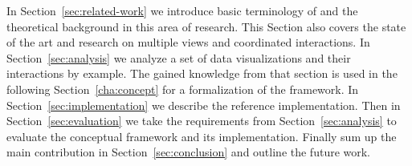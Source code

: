 In Section~\ref{sec:related-work} we introduce basic terminology of \cmvs{} and the theoretical background in this area of research.
This Section also covers the state of the art and research on multiple views and coordinated interactions.
In Section~\ref{sec:analysis} we analyze a set of data visualizations and their interactions by example.
The gained knowledge from that section is used in the following Section~\ref{cha:concept} for a formalization of the \cmv{} framework.
In Section~\ref{sec:implementation} we describe the reference implementation.
Then in Section~\ref{sec:evaluation} we take the requirements from Section~\ref{sec:analysis} to evaluate the conceptual framework and its implementation.
Finally sum up the main contribution in Section~\ref{sec:conclusion} and outline the future work.

